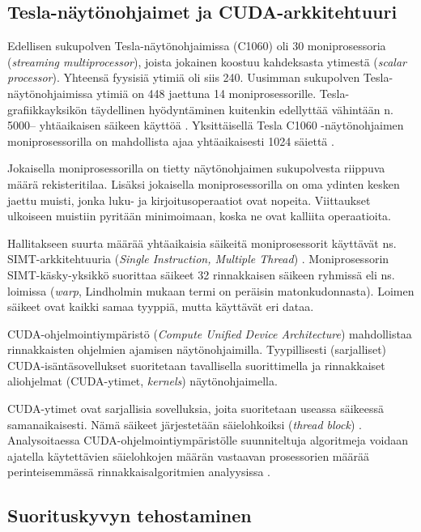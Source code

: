 \documentclass[a4paper,11pt]{article}
\newcommand{\engl}[1]{\foreignlanguage{english}{\em #1}}
\begin{document}
\subsection{Tesla-näytönohjaimet ja CUDA-arkkitehtuuri}

Edellisen sukupolven Tesla-näytönohjaimissa (C1060) oli 30 moniprosessoria (\engl{streaming multiprocessor}), joista jokainen koostuu kahdeksasta ytimestä (\engl{scalar processor}). Yhteensä fyysisiä ytimiä oli siis 240. Uusimman sukupolven Tesla-näytönohjaimissa ytimiä on 448 jaettuna 14 moniprosessorille. Tesla-grafiikkayksikön täydellinen hyödyntäminen kuitenkin edellyttää vähintään n. 5000\thinspace-- yhtäaikaisen säikeen käyttöä \cite{leischner2010}. Yksittäisellä Tesla C1060 -näytönohjaimen moniprosessorilla on mahdollista ajaa yhtäaikaisesti 1024 säiettä \cite{satish2009}.

Jokaisella moniprosessorilla on tietty näytönohjaimen sukupolvesta riippuva määrä rekisteritilaa. Lisäksi jokaisella moniprosessorilla on oma ydinten kesken jaettu muisti, jonka luku- ja kirjoitusoperaatiot ovat nopeita. Viittaukset ulkoiseen muistiin pyritään minimoimaan, koska ne ovat kalliita operaatioita.

Hallitakseen suurta määrää yhtäaikaisia säikeitä moniprosessorit käyttävät ns. SIMT-arkkitehtuuria (\engl{Single Instruction, Multiple Thread}) \cite{lindholm2008}. Moniprosessorin SIMT-käsky-yksikkö suorittaa säikeet 32 rinnakkaisen säikeen ryhmissä eli ns. loimissa (\engl{warp}, Lindholmin \cite{lindholm2008} mukaan termi on peräisin matonkudonnasta). Loimen säikeet ovat kaikki samaa tyyppiä, mutta käyttävät eri dataa.

CUDA-ohjelmointiympäristö (\engl{Compute Unified Device Architecture}) \cite{cudaprogramming} mahdollistaa rinnakkaisten ohjelmien ajamisen näytönohjaimilla. Tyypillisesti (sarjalliset) CUDA-isäntäsovellukset suoritetaan tavallisella suorittimella ja rinnakkaiset aliohjelmat (CUDA-ytimet, \engl{kernels}) näytönohjaimella.

CUDA-ytimet ovat sarjallisia sovelluksia, joita suoritetaan useassa säikeessä samanaikaisesti. Nämä säikeet järjestetään säielohkoiksi (\engl{thread block}) \cite{cudaprogramming}. Analysoitaessa CUDA-ohjelmointiympäristölle suunniteltuja algoritmeja voidaan ajatella käytettävien säielohkojen määrän vastaavan prosessorien määrää perinteisemmässä rinnakkaisalgoritmien analyysissa \cite{satish2009}.

\subsection{Suorituskyvyn tehostaminen}
\end{document}
